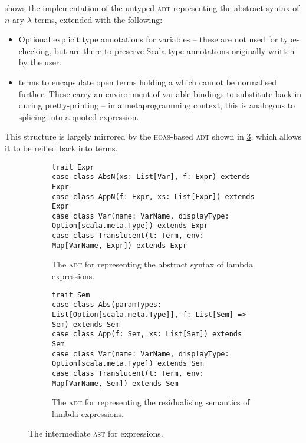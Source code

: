 \documentclass[../../../main.tex]{subfiles}
\begin{document}
%
 shows the implementation of the untyped  \textsc{adt} representing the abstract syntax of $n$-ary $\lambda$-terms, extended with the following:
\begin{itemize}
  \item Optional explicit type annotations for variables -- these are not used for type-checking, but are there to preserve Scala type annotations originally written by the user.
  \item {} terms to encapsulate open terms holding a  which cannot be normalised further. These carry an environment of variable bindings to substitute back in during pretty-printing -- in a metaprogramming context, this is analogous to splicing into a quoted expression.
\end{itemize}
This structure is largely mirrored by the \textsc{hoas}-based  \textsc{adt} shown in \cref{fig:sem-adt}, which allows it to be reified back into  terms.

\begin{figure}
\begin{subfigure}{\textwidth}
\begin{verbatim}
trait Expr
case class AbsN(xs: List[Var], f: Expr) extends Expr
case class AppN(f: Expr, xs: List[Expr]) extends Expr
case class Var(name: VarName, displayType: Option[scala.meta.Type]) extends Expr
case class Translucent(t: Term, env: Map[VarName, Expr]) extends Expr
\end{verbatim}
\caption{The  \textsc{adt} for representing the abstract syntax of lambda expressions.}
\label{fig:expr-adt}
\end{subfigure}
%
\begin{subfigure}{\textwidth}
\vspace{3ex} %
\begin{verbatim}
trait Sem
case class Abs(paramTypes: List[Option[scala.meta.Type]], f: List[Sem] => Sem) extends Sem
case class App(f: Sem, xs: List[Sem]) extends Sem
case class Var(name: VarName, displayType: Option[scala.meta.Type]) extends Sem
case class Translucent(t: Term, env: Map[VarName, Sem]) extends Sem
\end{verbatim}
\caption{The  \textsc{adt} for representing the residualising semantics of lambda expressions.}
\label{fig:sem-adt}
\end{subfigure}
\caption{The intermediate \textsc{ast} for expressions.}
\end{figure}
\end{document}
